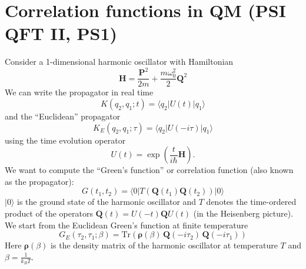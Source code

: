     \section{Correlation functions in QM (PSI QFT II, PS1)}
    
    Consider a 1-dimensional harmonic oscillator with Hamiltonian
    \begin{equation}
        \mathbf{H} = \frac{\mathbf{P}^2}{2m} + \frac{m\omega_0^2}{2}\mathbf{Q}^2
    \end{equation}
    We can write the propagator in real time
    \begin{equation}
        K(q_2, q_1; t) = \langle q_2 | U(t) | q_1 \rangle
    \end{equation}
    and the ``Euclidean'' propagator
    \begin{equation}
        K_E(q_2, q_1; \tau) = \langle q_2 | U(-i\tau) | q_1 \rangle
    \end{equation}
    using the time evolution operator
    \begin{equation}
        U(t) = \exp\!\left(\frac{t}{i\hbar}\mathbf{H}\right).
    \end{equation}
    We want to compute the ``Green's function'' or correlation function (also known as the propagator):
    \begin{equation}
        G(t_1, t_2) = \langle 0 | T(\mathbf{Q}(t_1)\mathbf{Q}(t_2)) | 0 \rangle
    \end{equation}
    $|0\rangle$ is the ground state of the harmonic oscillator and $T$ denotes the time-ordered product of the operators $\mathbf{Q}(t) = U(-t)\mathbf{Q}U(t)$ (in the Heisenberg picture). We start from the Euclidean Green's function at finite temperature
    \begin{equation}
        G_E(\tau_2, \tau_1; \beta) = \mathrm{Tr}\!\left(\boldsymbol{\rho}(\beta)\,\mathbf{Q}(-i\tau_2)\,\mathbf{Q}(-i\tau_1)\right)
    \end{equation}
    Here $\boldsymbol{\rho}(\beta)$ is the density matrix of the harmonic oscillator at temperature $T$ and $\beta = \frac{1}{k_B T}$.
    
